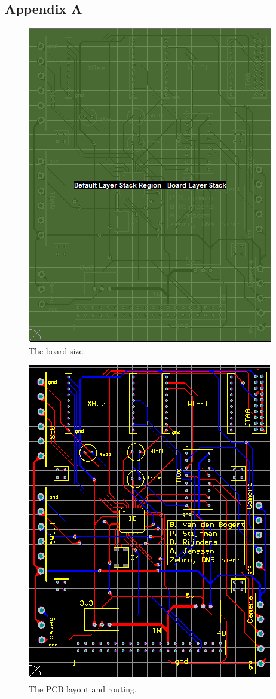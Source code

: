 \documentclass{article}
\begin{document}
\subsection{Appendix A}
\label{AppendixA}

\begin{figure}[H]
	\centering
	\includegraphics[scale=1]{figures/pcb2}
	\caption{The board size.}
	\label{pcb2}
\end{figure}

\begin{figure}[H]
	\centering
	\includegraphics[scale=1]{figures/pcb1}
	\caption{The PCB layout and routing. }
	\label{pcb1}
\end{figure}
\end{document}
